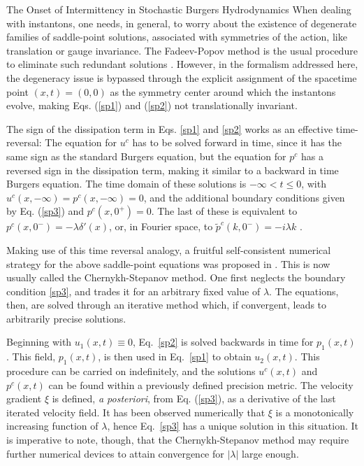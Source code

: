 \begin{chapter}{The Onset of Intermittency in Stochastic Burgers Hydrodynamics}
When dealing with instantons, one needs, in general, to worry about the existence of degenerate families of saddle-point solutions, associated with symmetries of the action, like translation or gauge invariance. The Fadeev-Popov method is the usual procedure to eliminate such redundant solutions \textcite{coleman1988,moriconi2009}. However, in the formalism addressed here, the degeneracy issue is bypassed through the explicit assignment of the spacetime point $(x,t)=(0,0)$ as the symmetry center around which the instantons evolve, making Eqs. (\ref{sp1}) and (\ref{sp2}) not translationally invariant.

The sign of the dissipation term in Eqs. \eqref{sp1} and \eqref{sp2} works as an effective time-reversal: The equation for $u^c$ has to be solved forward in time, since it has the same sign as the standard Burgers equation, but the equation for $p^c$ has a reversed sign in the dissipation term, making it similar to a backward in time Burgers equation. The time domain of these solutions is
$- \infty < t \leq 0$, with $u^c(x, - \infty) = p^c (x, - \infty) = 0$, and the additional boundary conditions given by Eq. (\ref{sp3}) and $p^c(x,0^+) = 0$. The last of these is equivalent to $p^c(x,0^-) = -\lambda \delta'(x)$, or, in Fourier space, to $\tilde p^c(k,0^-) = - i \lambda k$ \parencite{gurarie1996}. \label{burgers-boundary}

Making use of this time reversal analogy, a fruitful self-consistent numerical strategy for the above saddle-point equations was proposed in \textcite{chernykh2001}. This is now usually called the Chernykh-Stepanov method. One first neglects the boundary condition \eqref{sp3}, and trades it for an arbitrary fixed value of $\lambda$. The equations, then, are solved through an iterative method which, if convergent, leads to arbitrarily precise solutions.

Beginning with $u_1(x,t) \equiv 0$, Eq.~\eqref{sp2} is solved backwards in time for $p_1(x,t)$. This field, $p_1(x,t)$, is then used in Eq.~\eqref{sp1} to obtain $u_2(x,t)$. This procedure can be carried on indefinitely, and the solutions $u^c(x,t)$ and $p^c(x,t)$ can be found within a previously defined precision metric. The velocity gradient $\xi$ is defined, \textit{a posteriori}, from Eq. (\ref{sp3}), as a derivative of the last iterated velocity field. It has been observed numerically that $\xi$ is a monotonically increasing function of $\lambda$, hence Eq.~\eqref{sp3} has a unique solution in this situation. It is imperative to note, though, that the Chernykh-Stepanov method may require further numerical devices to attain convergence for $|\lambda|$ large enough.


\end{chapter}
